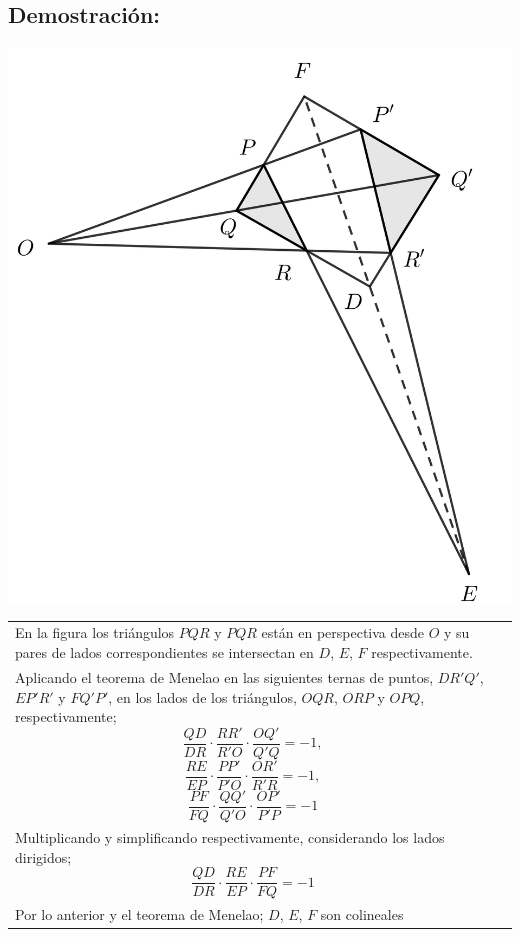 \documentclass[12pt,a4paper]{article}
\begin{document}
\subsection*{Demostración:}
\begin{center}
\includegraphics[scale=0.5]{Imagenes/desargue.png} 
\end{center}
\begin{tabular}{p{15.9 cm} p{1cm}}
En la figura los triángulos $PQR$ y $PQR$ están en perspectiva desde $O$ y su pares de lados correspondientes se intersectan en $D$, $E$, $F$ respectivamente.\\Aplicando el teorema de Menelao en las siguientes ternas de puntos, $DR'Q'$, $EP'R'$ y $FQ'P'$, en los lados de los triángulos, $OQR$, $ORP$ y $OPQ$, respectivamente; 
$$\dfrac{QD}{DR}\cdot\dfrac{RR'}{R'O}\cdot\dfrac{OQ'}{Q'Q}=-1,$$ 
$$\dfrac{RE}{EP}\cdot\dfrac{PP'}{P'O}\cdot \dfrac{OR'}{R'R}=-1,$$ $$\dfrac{PF}{FQ}\cdot\dfrac{QQ'}{Q'O}\cdot\dfrac{OP'}{P'P}=-1$$
\\Multiplicando y simplificando respectivamente, considerando los lados dirigidos; $$\dfrac{QD}{DR}\cdot \dfrac{RE}{EP}\cdot \dfrac{PF}{FQ}=-1$$ 
\\Por lo anterior y el teorema de Menelao; $D$, $E$, $F$ son colineales
\end{tabular}
\end{document}
